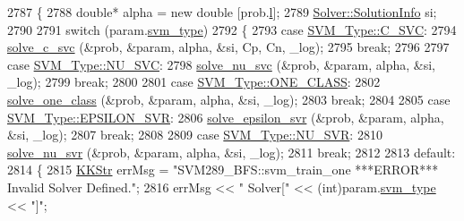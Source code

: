 \begin{DoxyCode}
2787 \{
2788   \textcolor{keywordtype}{double}*  alpha = \textcolor{keyword}{new} \textcolor{keywordtype}{double} [prob.\hyperlink{struct_s_v_m289___b_f_s_1_1svm__problem_afd75fe2ff65aa0c0f27b85b04028b2f3}{l}];
2789   \hyperlink{struct_s_v_m289___b_f_s_1_1_solver_1_1_solution_info}{Solver::SolutionInfo}  si;
2790 
2791   \textcolor{keywordflow}{switch}  (param.\hyperlink{struct_s_v_m289___b_f_s_1_1svm__parameter_a670b1be49bd630113fbf92dce2ebd9c4}{svm\_type})
2792   \{
2793     \textcolor{keywordflow}{case} \hyperlink{namespace_s_v_m233_acde4c278f323c82a6b41c27f6f30738aa942f03bda3ae7dbb9e945f161c95ab97}{SVM\_Type::C\_SVC}:
2794       \hyperlink{namespace_s_v_m289___b_f_s_a1ffc7754e8ec86580b0681e65b765d3c}{solve\_c\_svc} (&prob, &param, alpha, &si, Cp, Cn, \_log);
2795       \textcolor{keywordflow}{break};
2796 
2797     \textcolor{keywordflow}{case} \hyperlink{namespace_s_v_m233_acde4c278f323c82a6b41c27f6f30738aa7705bf71b9d3c7169b4d201acb2b30b8}{SVM\_Type::NU\_SVC}:
2798       \hyperlink{namespace_s_v_m289___b_f_s_a9a5bacd3c695e0b7e350ab9aa509e838}{solve\_nu\_svc} (&prob, &param, alpha, &si, \_log);
2799       \textcolor{keywordflow}{break};
2800 
2801     \textcolor{keywordflow}{case} \hyperlink{namespace_s_v_m233_acde4c278f323c82a6b41c27f6f30738aaea64d54fb16ebcd95d48c4aef97036df}{SVM\_Type::ONE\_CLASS}:
2802       \hyperlink{namespace_s_v_m289___b_f_s_aa238dc0bd857a07ed5861d37d34666a7}{solve\_one\_class} (&prob, &param, alpha, &si, \_log);
2803       \textcolor{keywordflow}{break};
2804 
2805     \textcolor{keywordflow}{case} \hyperlink{namespace_s_v_m233_acde4c278f323c82a6b41c27f6f30738aae7f29e93ef95067dcc6827e4fe3071c7}{SVM\_Type::EPSILON\_SVR}:
2806       \hyperlink{namespace_s_v_m289___b_f_s_ac6eb94ba42385e7ca90b1612effb2e7e}{solve\_epsilon\_svr} (&prob, &param, alpha, &si, \_log);
2807       \textcolor{keywordflow}{break};
2808 
2809     \textcolor{keywordflow}{case} \hyperlink{namespace_s_v_m233_acde4c278f323c82a6b41c27f6f30738aaa9c624ae638f160fb1f00081960014b6}{SVM\_Type::NU\_SVR}:
2810       \hyperlink{svm289___b_f_s_8cpp_a44c077793496b16be8ff897c020a1bfe}{solve\_nu\_svr} (&prob, &param, alpha, &si, \_log);
2811       \textcolor{keywordflow}{break};
2812 
2813     \textcolor{keywordflow}{default}:
2814       \{
2815         \hyperlink{class_k_k_b_1_1_k_k_str}{KKStr} errMsg = \textcolor{stringliteral}{"SVM289\_BFS::svm\_train\_one   ***ERROR***   Invalid Solver Defined."};
2816         errMsg << \textcolor{stringliteral}{"   Solver["} << (int)param.\hyperlink{struct_s_v_m289___b_f_s_1_1svm__parameter_a670b1be49bd630113fbf92dce2ebd9c4}{svm\_type} << \textcolor{stringliteral}{"]"};

\end{DoxyCode}
